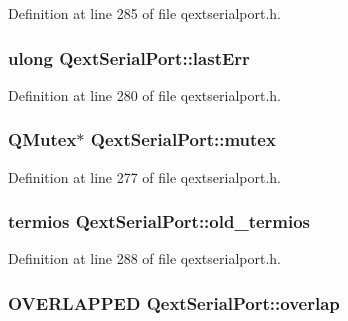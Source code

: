 Definition at line 285 of file qextserialport.\-h.

\hypertarget{class_qext_serial_port_a068360e01b2a7adc7bce904db45459d5}{
\subsubsection[{last\-Err}]{\setlength{\rightskip}{0pt plus 5cm}ulong Qext\-Serial\-Port\-::last\-Err\hspace{0.3cm}{\ttfamily [protected]}}}\label{class_qext_serial_port_a068360e01b2a7adc7bce904db45459d5}


Definition at line 280 of file qextserialport.\-h.

\hypertarget{class_qext_serial_port_a308d281fcb5c096f259263ef8fea8924}{
\subsubsection[{mutex}]{\setlength{\rightskip}{0pt plus 5cm}Q\-Mutex$\ast$ Qext\-Serial\-Port\-::mutex\hspace{0.3cm}{\ttfamily [protected]}}}\label{class_qext_serial_port_a308d281fcb5c096f259263ef8fea8924}


Definition at line 277 of file qextserialport.\-h.

\hypertarget{class_qext_serial_port_a1eb0b02daef68e0d49b8837614726763}{
\subsubsection[{old\-\_\-termios}]{ termios Qext\-Serial\-Port\-::old\-\_\-termios\hspace{0.3cm}{\ttfamily [protected]}}}\label{class_qext_serial_port_a1eb0b02daef68e0d49b8837614726763}


Definition at line 288 of file qextserialport.\-h.

\hypertarget{class_qext_serial_port_a46b60d5c914dcb4e10ae3027c5c55d13}{
\subsubsection[{overlap}]{\setlength{\rightskip}{0pt plus 5cm}O\-V\-E\-R\-L\-A\-P\-P\-E\-D Qext\-Serial\-Port\-::overlap\hspace{0.3cm}{\ttfamily [protected]}}}\label{class_qext_serial_port_a46b60d5c914dcb4e10ae3027c5c55d13}


